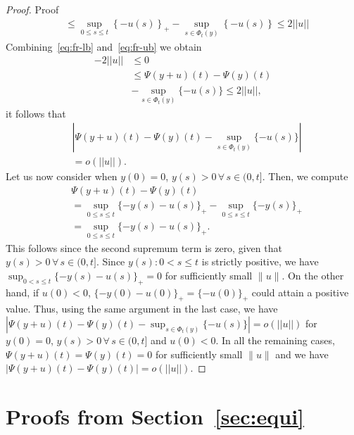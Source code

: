 \documentclass[11pt,leqno]{amsart}
\begin{document}
\begin{proof}{Proof}
\begin{align}
    &\leq \sup_{0\leq s\leq t}\left\{-u(s)\right\}_+-\sup_{s\in\Phi_t(y)}\left\{-u(s)\right\}
    \label{eq:fr-ub}
    \leq 2||u||
\end{align}
Combining~\eqref{eq:fr-lb} and~\eqref{eq:fr-ub} we obtain
\begin{align*}
    -2||u||&\leq 0\\
    &\leq\Psi(y+u)(t)-\Psi(y)(t)\\
    &-\sup_{s\in\Phi_t(y)}\{-u(s)\} \leq 2||u||, 
\end{align*}
it follows that
\begin{align*}
    &|\Psi(y+u)(t)-\Psi(y)(t)-\sup_{s\in\Phi_t(y)}\{-u(s)\}|\\&
    =o( ||u||).
\end{align*}
Let us now consider when $y(0)=0$, $y(s)>0\,\forall \,s\in(0,t]$. Then, we compute
\begin{align*}
    &\Psi(y+u)(t)-\Psi(y)(t)\\
    &=\sup_{0\leq s\leq t}\{-y(s)-u(s)\}_+-\sup_{0\leq s\leq t}\{-y(s)\}_+\\
    &= \sup_{0\leq s\leq t}\{-y(s)-u(s)\}_+.
\end{align*}
This follows since the second supremum term is zero, given that $y(s)>0\,\forall \,s\in(0,t]$.
Since $y(s): 0<s\leq t$ is strictly positive,
we have $\sup_{0< s\leq t}\{-y(s)-u(s)\}_+ =0$ for sufficiently small $\|u\|$. On the other hand, if $u(0)<0$, $\{-y(0)-u(0)\}_+=\{-u(0)\}_+$ could attain a positive value. Thus, using the same argument in the last case, we have 
$|\Psi(y+u)(t)-\Psi(y)(t)-\sup_{s\in\Phi_t(y)}\{-u(s)\}|=o(||u||)$
for  $y(0)=0$, $y(s)>0\,\forall \,s\in(0,t]$ and $u(0)<0$.
In all the remaining cases, $\Psi(y+u)(t) = \Psi(y)(t) = 0$ for sufficiently small $\|u\|$ and we have
$|\Psi(y+u)(t)-\Psi(y)(t)|=o(||u||).$  
\end{proof}
\section{Proofs from Section~\ref{sec:equi}}\label{sec:equi-proofs}
\end{document}

